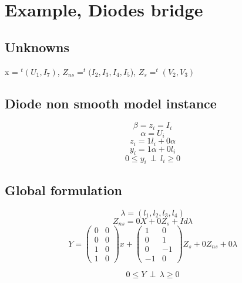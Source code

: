 \documentclass[10pt]{article}
\begin{document}
\section{Example, Diodes bridge}

\begin{figure}[h]
\centerline{
 \scalebox{0.7}{
    
 }
}\end{figure}




\subsection{Unknowns}

x = $^{t}(U_{1},I_{7})$,
$Z_{ns}=^{t}(I_{2},I_{3},I_{4},I_{5}$),
$Z_{s} = ^{t}(V_{2},V_{3})$
\subsection{Diode non smooth model instance}

\[ \beta = z_{i} = I_{i}\]
\[ \alpha =U_{i}\]
\[z_{i}=1l_{i}+0\alpha\]
\[y_{i}=1\alpha+0l_{i}\]
\[0 \leq y_{i} \, \perp \, l_{i} \geq 0\]


\subsection{Global formulation}

\[ \lambda =(l_{1},l_{2},l_{3},l_{4})\]
\[Z_{ns}=0X+0Z_{s}+Id\lambda\]
\[Y=\left(\begin{array}{cc}
0&0\\
0&0\\
1&0\\
1&0\end{array}\right) x+
\left(\begin{array}{cc}
1&0\\
0&1\\
0&-1\\
-1&0\end{array}
\right) Z_{s} + 0Z_{ns} +0\lambda\]

\[0 \leq Y \, \perp \, \lambda \geq 0\]
\end{document}
